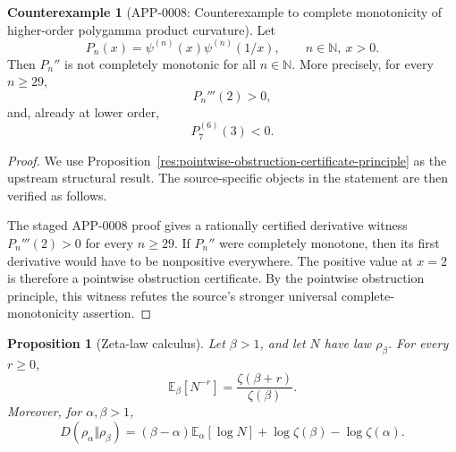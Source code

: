 \documentclass[11pt]{article}
\numberwithin{equation}{section}
\newtheorem{proposition}[theorem]{Proposition}
\theoremstyle{definition}
\newtheorem{counterexample}[theorem]{Counterexample}
\theoremstyle{remark}
\newcommand{\E}{\mathbb E}
\newcommand{\N}{\mathbb N}
\newcommand{\1}{\mathbf 1}
\begin{document}
\begin{counterexample}[APP-0008: Counterexample to complete monotonicity of higher-order polygamma product curvature]
\label{thm:pn-complete-monotonicity-counterexample}
Let
\begin{equation}
\label{eq:pn-product}
P_n(x)=\psi^{(n)}(x)\psi^{(n)}(1/x),\qquad n\in\N,\ x>0.
\end{equation}
Then \(P_n''\) is not completely monotonic for all \(n\in\N\).  More precisely, for every \(n\ge29\),
\begin{equation}
\label{eq:pn-high-order-third-positive}
P_n'''(2)>0,
\end{equation}
and, already at lower order,
\begin{equation}
\label{eq:p7-sixth-negative}
P_7^{(6)}(3)<0.
\end{equation}


\end{counterexample}

\begin{proof}
We use Proposition~\ref{res:pointwise-obstruction-certificate-principle} as the upstream structural result. The source-specific objects in the statement are then verified as follows.

The staged APP-0008 proof gives a rationally certified derivative witness \(P_n'''(2)>0\) for every \(n\ge29\). If \(P_n''\) were completely monotone, then its first derivative would have to be nonpositive everywhere. The positive value at \(x=2\) is therefore a pointwise obstruction certificate. By the pointwise obstruction principle, this witness refutes the source's stronger universal complete-monotonicity assertion.
\end{proof}

\begin{proposition}[Zeta-law calculus]
\label{prop:zeta-law-calculus}
Let \(\beta>1\), and let \(N\) have law \(\rho_\beta\).  For every \(r\ge0\),
\begin{equation}
\label{eq:zeta-law-moment}
\E_\beta[N^{-r}]=\frac{\zeta(\beta+r)}{\zeta(\beta)}.
\end{equation}
Moreover, for \(\alpha,\beta>1\),
\begin{equation}
\label{eq:zeta-law-relative-entropy}
D(\rho_\alpha\Vert\rho_\beta)
=(\beta-\alpha)\E_\alpha[\log N]
+\log\zeta(\beta)-\log\zeta(\alpha).
\end{equation}
\end{proposition}
\end{document}
